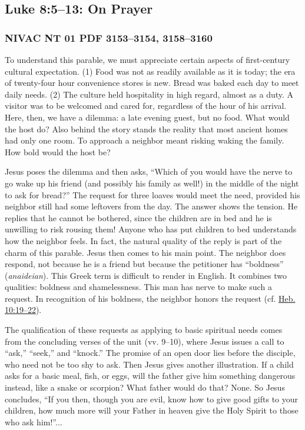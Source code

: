 	\subsection{Luke 8:5--13: On Prayer}
		\label{EXSS-NT-LUKE-8-PRAYER}
		
		\subsubsection{NIVAC NT 01 PDF 3153--3154, 3158--3160}
		
			To understand this parable, we must appreciate certain aspects of first-century cultural expectation. (1) Food was not as readily available as it is today; the era of twenty-four hour convenience stores is new. Bread was baked each day to meet daily needs. (2) The culture held hospitality in high regard, almost as a duty. A visitor was to be welcomed and cared for, regardless of the hour of his arrival. Here, then, we have a dilemma: a late evening guest, but no food. What would the host do? Also behind the story stands the reality that most ancient homes had only one room. To approach a neighbor meant risking waking the family. How bold would the host be? 

			Jesus poses the dilemma and then asks, ``Which of you would have the nerve to go wake up his friend (and possibly his family as well!) in the middle of the night to ask for bread?'' The request for three loaves would meet the need, provided his neighbor still had some leftovers from the day. The answer shows the tension. He replies that he cannot be bothered, since the children are in bed and he is unwilling to risk rousing them! Anyone who has put children to bed understands how the neighbor feels. In fact, the natural quality of the reply is part of the charm of this parable. Jesus then comes to his main point. The neighbor does respond, not because he is a friend but because the petitioner has ``boldness'' (\textit{anaideian}). This Greek term is difficult to render in English. It combines two qualities: boldness and shamelessness. This man has nerve to make such a request. In recognition of his boldness, the neighbor honors the request (cf. \hyperref[HEBREWS-10-19]{Heb. 10:19--22}). 

			The qualification of these requests as applying to basic spiritual needs comes from the concluding verses of the unit (vv. 9--10), where Jesus issues a call to ``ask,'' ``seek,'' and ``knock.'' The promise of an open door lies before the disciple, who need not be too shy to ask. Then Jesus gives another illustration. If a child asks for a basic meal, fish, or eggs, will the father give him something dangerous instead, like a snake or scorpion? What father would do that? None. So Jesus concludes, ``If you then, though you are evil, know how to give good gifts to your children, how much more will your Father in heaven give the Holy Spirit to those who ask him!''... 

